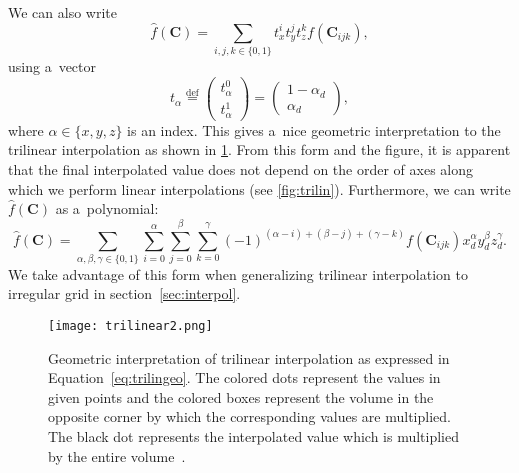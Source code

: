 				\noindent We can also write
					\begin{equation}
						\label{eq:trilingeo}
						\widehat{f}(\mathbf{C}) = \sum_{i,j,k \in \{0,1\}} t_x^i t_y^j t_z^k f(\mathbf{C}_{ijk}),
					\end{equation}
				using a~vector
					\begin{equation}
						t_\alpha \stackrel{\text{def}}{=} \begin{pmatrix}t_\alpha^0\\ t_\alpha^1\end{pmatrix} = \begin{pmatrix}1-\alpha_d\\ \alpha_d\end{pmatrix},
					\end{equation}
				where $\alpha \in \{x,y,z\}$ is an index. This gives a~nice geometric interpretation to the trilinear interpolation as shown in \cref{fig:trilin2}. From this form and the figure, it is apparent that the final interpolated value does not depend on the order of axes along which we perform linear interpolations (see \cref{fig:trilin}). Furthermore, we can write $\widehat{f}(\mathbf{C})$ as a~polynomial:
					\begin{equation}
						\label{eq:trilinpoly}
						\widehat{f}(\mathbf{C}) = \sum_{\alpha,\beta,\gamma \in \{0,1\}}\sum^{\alpha}_{i=0}\sum^{\beta}_{j=0}\sum^{\gamma}_{k=0} 	(-1)^{(\alpha-i)+(\beta-j)+(\gamma-k)} f(\mathbf{C}_{ijk}) x_d^\alpha y_d^\beta z_d^\gamma.
					\end{equation}
				We take advantage of this form when generalizing trilinear interpolation to irregular grid in section~\ref{sec:interpol}.
					
				\begin{figure}
					\centering
					\texttt{[image: trilinear2.png]}
					\caption{Geometric interpretation of trilinear interpolation as expressed in Equation~\ref{eq:trilingeo}. The colored dots represent the values in given points and the colored boxes represent the volume in the opposite corner by which the corresponding values are multiplied. The black dot represents the interpolated value which is multiplied by the entire volume~\cite{trilinear}.}
					\label{fig:trilin2}
				\end{figure}